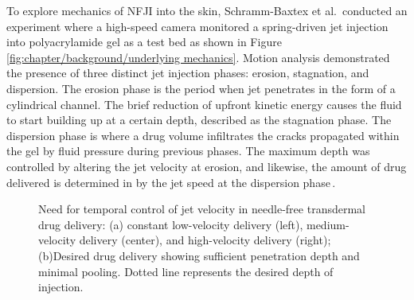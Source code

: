         To explore mechanics of NFJI into the skin, Schramm-Baxtex et al.\,\cite{Schramm-Baxter2004b} conducted an experiment where a high-speed camera monitored a spring-driven jet injection into polyacrylamide gel as a test bed as shown in Figure\,\ref{fig:chapter/background/underlying mechanics}. Motion analysis demonstrated the presence of three distinct jet injection phases: erosion, stagnation, and dispersion. The erosion phase is the period when jet penetrates in the form of a cylindrical channel. The brief reduction of upfront kinetic energy causes the fluid to start building up at a certain depth, described as the stagnation phase. The dispersion phase is where a drug volume infiltrates the cracks propagated within the gel by fluid pressure during previous phases. The maximum depth was controlled by altering the jet velocity at erosion, and likewise, the amount of drug delivered is determined in by the jet speed at the dispersion phase\,\cite{Stachowiak2009}.
        
        
        \begin{figure}[!ht]
            \centering
            \qquad
            \caption{
                Need for temporal control of jet velocity in needle-free transdermal drug delivery: (a) constant low-velocity delivery (left), medium-velocity delivery (center), and high-velocity delivery (right); (b)Desired drug delivery showing sufficient penetration depth and minimal pooling. Dotted line represents the desired depth of injection.
            }   \label{fig:chapter/background/2 speeds mechanics}
        \end{figure}
        
